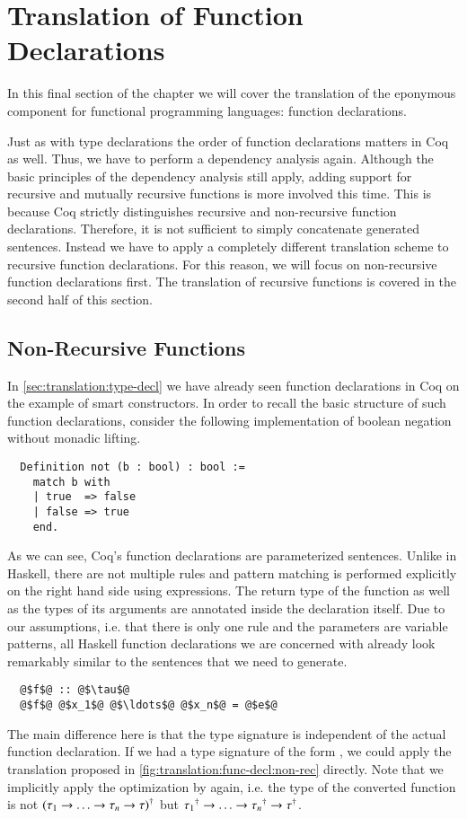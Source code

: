 \section{Translation of Function Declarations} \label{sec:translation:func-decl}
In this final section of the chapter we will cover the translation of the eponymous component for functional programming languages: function declarations.

Just as with type declarations the order of function declarations matters in Coq as well.
Thus, we have to perform a dependency analysis again.
Although the basic principles of the dependency analysis still apply, adding support for recursive and mutually recursive functions is more involved this time.
This is because Coq strictly distinguishes recursive and non-recursive function declarations.
Therefore, it is not sufficient to simply concatenate generated sentences.
Instead we have to apply a completely different translation scheme to recursive function declarations.
For this reason, we will focus on non-recursive function declarations first.
The translation of recursive functions is covered in the second half of this section.

\subsection{Non-Recursive Functions}
In \autoref{sec:translation:type-decl} we have already seen function declarations in Coq on the example of smart constructors.
In order to recall the basic structure of such function declarations, consider the following implementation of boolean negation without monadic lifting.
\begin{verbatim}
  Definition not (b : bool) : bool :=
    match b with
    | true  => false
    | false => true
    end.
\end{verbatim}
As we can see, Coq's function declarations are parameterized  sentences.
Unlike in Haskell, there are not multiple rules and pattern matching is performed explicitly on the right hand side using  expressions.
The return type of the function as well as the types of its arguments are annotated inside the declaration itself.
Due to our assumptions, i.e. that there is only one rule and the parameters are variable patterns, all Haskell function declarations we are concerned with already look remarkably similar to the  sentences that we need to generate.
\begin{verbatim}
  @$f$@ :: @$\tau$@
  @$f$@ @$x_1$@ @$\ldots$@ @$x_n$@ = @$e$@
\end{verbatim}
The main difference here is that the type signature is independent of the actual function declaration.
If we had a type signature of the form , we could apply the translation proposed in \autoref{fig:translation:func-decl:non-rec} directly.
Note that we implicitly apply the optimization by \cite{Abel:2005} again, i.e.
the type of the converted function is not ${(\tau_1 \rightarrow \ldots \rightarrow \tau_n \rightarrow \tau)}^{\dagger}$ but ${\tau_1}^{\dagger} \rightarrow \ldots \rightarrow {\tau_n}^{\dagger} \rightarrow {\tau}^{\dagger}$.

